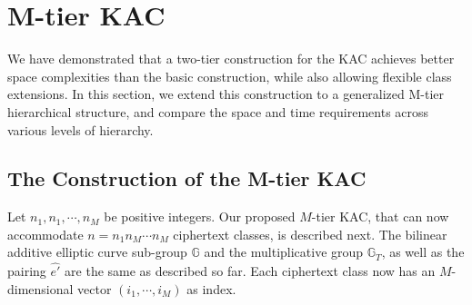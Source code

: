 \section{M-tier KAC}
\label{sec:Mtier}

We have demonstrated that a two-tier construction for the KAC achieves better space complexities than the basic construction, while also allowing flexible class extensions. In this section, we extend this construction to a generalized M-tier hierarchical structure, and compare the space and time requirements across various levels of hierarchy.

\subsection{The Construction of the M-tier KAC}
\label{subsec:constructionM}

Let $n_1,n_1,\cdots,n_{M}$ be positive integers. Our proposed $M$-tier KAC, that can now accommodate $n=n_1n_M\cdots n_M$ ciphertext classes, is described next. The bilinear additive elliptic curve sub-group $\mathbb{G}$ and the multiplicative group $\mathbb{G}_T$, as well as the pairing $\hat{e'}$ are the same as described so far. Each ciphertext class now has an $M$-dimensional vector $(i_1,\cdots,i_M)$ as index.

